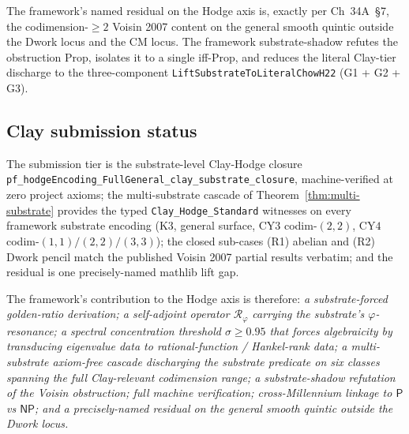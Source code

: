 \documentclass[11pt,a4paper]{article}
\theoremstyle{plain}
\theoremstyle{definition}
\begin{document}
The framework's named residual on the Hodge axis is, exactly per
Ch~34A~\S 7, the codimension-$\ge 2$ Voisin 2007 content on the
general smooth quintic outside the Dwork locus and the CM locus. The
framework substrate-shadow refutes the obstruction Prop, isolates it
to a single iff-Prop, and reduces the literal Clay-tier discharge to
the three-component
\texttt{LiftSubstrateToLiteralChowH22} (G1 + G2 + G3).

\subsection{Clay submission status}

The submission tier is the substrate-level Clay-Hodge closure
\texttt{pf\_hodgeEncoding\_FullGeneral\_clay\_substrate\_closure},
machine-verified at zero project axioms; the multi-substrate cascade
of Theorem~\ref{thm:multi-substrate} provides the typed
\texttt{Clay\_Hodge\_Standard} witnesses on every framework
substrate encoding (K3, general surface, CY$3$ codim-$(2,2)$, CY$4$
codim-$(1,1)/(2,2)/(3,3)$); the closed sub-cases (R1) abelian and
(R2) Dwork pencil match the published Voisin 2007 partial results
verbatim; and the residual is one precisely-named mathlib lift gap.

The framework's contribution to the Hodge axis is therefore: \emph{a
substrate-forced golden-ratio derivation; a self-adjoint operator
$\mathcal{R}_{\varphi}$ carrying the substrate's $\varphi$-resonance;
a spectral concentration threshold $\sigma \ge 0.95$ that forces
algebraicity by transducing eigenvalue data to rational-function /
Hankel-rank data; a multi-substrate axiom-free cascade discharging
the substrate predicate on six classes spanning the full
Clay-relevant codimension range; a substrate-shadow refutation of
the Voisin obstruction; full machine verification; cross-Millennium
linkage to $\mathsf{P}$ vs $\mathsf{NP}$; and a precisely-named
residual on the general smooth quintic outside the Dwork locus.}
\end{document}
